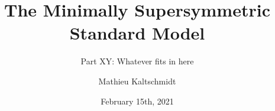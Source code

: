 \title{The Minimally Supersymmetric Standard Model}
\subtitle{Part XY: Whatever fits in here}
\author{Mathieu Kaltschmidt}
\date{February 15th, 2021}

\usepackage{xcolor}


\usepackage{fancyhdr}
\fancyhfoffset{0pt}

\usepackage[a4paper,
			width = 150mm,
			top = 30mm,
		    bottom=30mm,
		    ]{geometry}
\usepackage[onehalfspacing]{setspace}


\makeatletter
\pagestyle{fancy}
\fancyhf{}
\fancyhead[L]{\footnotesize\nouppercase\leftmark}
\fancyhead[R]{\footnotesize\nouppercase\@title}
\fancyfoot[C]{\thepage}
\renewcommand{\headrulewidth}{0.2pt}
\renewcommand{\footrulewidth}{0pt}
\makeatother



\usepackage{amsmath, amssymb, commath, mathtools}
\usepackage{physics}
\usepackage{slashed}
\usepackage{xfrac}
\usepackage[separate-uncertainty]{siunitx}
\usepackage{relsize} %
\usepackage{bbm}
\usepackage{chngcntr}
\usepackage[amsmath,thmmarks,hyperref]{ntheorem}
\usepackage{ wasysym }

\theoremstyle{nonumberbreak}
\theoremseparator{} 
\theoremsymbol{\ensuremath{\square}}
\newtheorem{proof}{\textit{Proof.}}

\usepackage{array} %
\usepackage{booktabs} %

\usepackage{fontspec, xunicode}
\usepackage[utf8]{inputenc}
\usepackage{lmodern}
\setmainfont{Palatino}
\setsansfont{Optima}
\setmonofont[Scale=MatchLowercase]{Menlo}
\usepackage{polyglossia}
\setmainlanguage{english}
\usepackage{microtype}
\usepackage{scrextend} %
\usepackage{csquotes}
\usepackage{graphicx} %
\usepackage{float} %
\usepackage{blindtext} %
\usepackage[labelfont=bf]{caption} %
\usepackage{subcaption} %
\usepackage{tikz}
\usetikzlibrary{patterns, decorations.markings}
\usepackage{tcolorbox}

